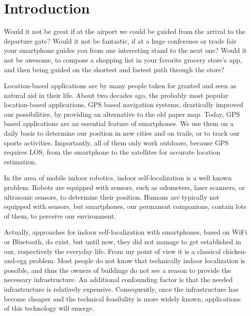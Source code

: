\chapter{Introduction} \label{chap:intro}

Would it not be great if at the airport we could be guided from the arrival to the departure gate? Would it not be fantastic, if at a huge conference or trade fair your smartphone guides you from one interesting stand to the next one? Would it not be awesome, to compose a shopping list in your favorite grocery store's app, and then being guided on the shortest and fastest path through the store?

Location-based applications are by many people taken for granted and seen as natural aid in their life. About two decades ago, the probably most popular location-based applications, \acs{GPS} based navigation systems, drastically improved our possibilities, by providing an alternative to the old paper map. Today, \acs{GPS} based applications are an essential feature of smartphones. We use them on a daily basis to determine our position in new cities and on trails, or to track our sports activities. Importantly, all of them only work outdoors, because \acs{GPS} requires \acl{LOS}, from the smartphone to the satellites for accurate location estimation.

In the area of mobile indoor robotics, indoor self-localization is a well known problem. Robots are equipped with sensors, such as odometers, laser scanners, or ultrasonic sensors, to determine their position. Humans are typically not equipped with sensors, but smartphones, our permanent companions, contain lots of them, to perceive our environment.

Actually, approaches for indoor self-localization with smartphones, based on WiFi or Bluetooth, do exist, but until now, they did not manage to get established in our, respectively the everyday life. From my point of view it is a classical chicken-and-egg problem. Most people do not know that technically indoor localization is possible, and thus the owners of buildings do not see a reason to provide the necessary infrastructure. An additional confounding factor is that the needed infrastructure is relatively expensive. Consequently, once the infrastructure has become cheaper and the technical feasibility is more widely known, applications of this technology will emerge.

